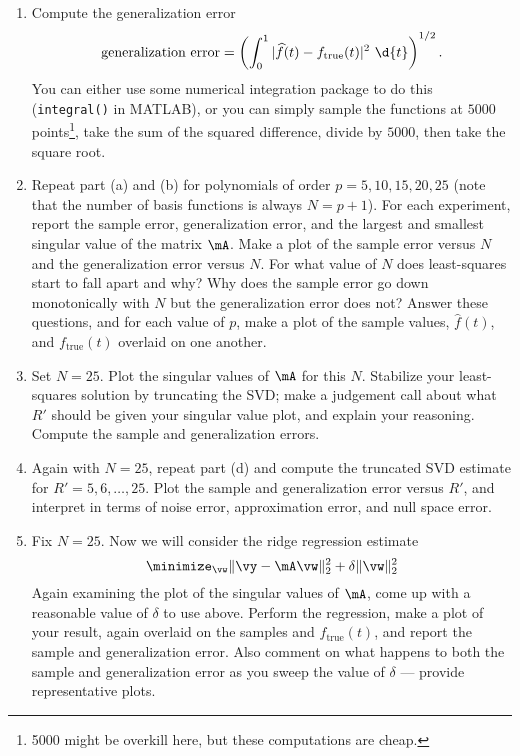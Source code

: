 \documentclass[11pt]{article}
\begin{document}
\begin{enumerate}
\begin{enumerate}
	\item Compute the generalization error
	\[
		\text{generalization error} = \left(\int_{0}^1|\widehat{f}(t)-f_{\mathrm{true}}(t)|^2~\d{t}\right)^{1/2}.
	\]
	You can either use some numerical integration package to do this (\texttt{integral()} in MATLAB), or you can simply sample the functions at $5000$ points\footnote{5000 might be overkill here, but these computations are cheap.}, take the sum of the squared difference, divide by $5000$, then take the square root.
	
	\item Repeat part (a) and (b) for polynomials of order $p=5,10,15,20,25$ (note that the number of basis functions is always $N=p+1$).  For each experiment, report the sample error, generalization error, and the largest and smallest singular value of the matrix $\mA$.  Make a plot of the sample error versus $N$ and the generalization error versus $N$.  For what value of $N$ does least-squares start to fall apart and why?  Why does the sample error go down monotonically with $N$ but the generalization error does not?  Answer these questions, and for each value of $p$, make a plot of the sample values, $\widehat{f}(t)$, and $f_{\mathrm{true}}(t)$ overlaid on one another.
	
	\item Set $N=25$.  Plot the singular values of $\mA$ for this $N$.  Stabilize your least-squares solution by truncating the SVD; make a judgement call about what $R'$ should be given your singular value plot, and explain your reasoning.  Compute the sample and generalization errors.
	
	\item Again with $N=25$, repeat part (d) and compute the truncated SVD estimate for $R'=5,6,\ldots,25$.  Plot the sample and generalization error versus $R'$, and interpret in terms of noise error, approximation error, and null space error.
	
	\item Fix $N=25$.  Now we will consider the ridge regression estimate
	\[
		\minimize_{\vw} \|\vy-\mA\vw\|_2^2 + \delta\|\vw\|_2^2
	\]
	Again examining the plot of the singular values of $\mA$, come up with a reasonable value of $\delta$ to use above.  Perform the regression, make a plot of your result, again overlaid on the samples and $f_{\mathrm{true}}(t)$, and report the sample and generalization error.  Also comment on what happens to both the sample and generalization error as you sweep the value of $\delta$ --- provide representative plots.
\end{enumerate}
 

\end{enumerate}
\end{document}
